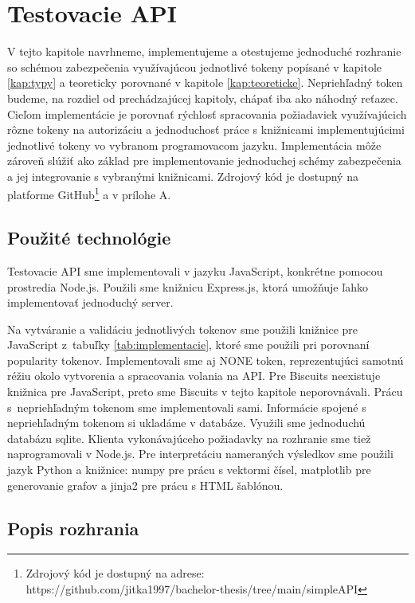 \chapter{Testovacie API}

\label{kap:prakticke} %

V tejto kapitole navrhneme, implementujeme a otestujeme jednoduché rozhranie so schémou zabezpečenia využívajúcou jednotlivé tokeny popísané v kapitole \ref{kap:typy} a teoreticky porovnané v kapitole \ref{kap:teoreticke}. Nepriehľadný token budeme, na rozdiel od prechádzajúcej kapitoly, chápať iba ako náhodný reťazec. Cieľom implementácie je porovnať rýchlosť spracovania požiadaviek využívajúcich rôzne tokeny na autorizáciu a jednoduchosť práce s knižnicami implementujúcimi jednotlivé tokeny vo vybranom programovacom jazyku. Implementácia môže zároveň slúžiť ako základ pre implementovanie jednoduchej schémy zabezpečenia a jej integrovanie s vybranými knižnicami. Zdrojový kód je dostupný na platforme GitHub\footnote{Zdrojový kód je dostupný na adrese:\\ https://github.com/jitka1997/bachelor-thesis/tree/main/simpleAPI} a v prílohe A.

\section{Použité technológie}

Testovacie API sme implementovali v jazyku JavaScript, konkrétne pomocou prostredia Node.js. Použili sme knižnicu Express.js, ktorá umožňuje ľahko implementovať jednoduchý server.

Na vytváranie a validáciu jednotlivých tokenov sme použili knižnice pre JavaScript z~tabuľky \ref{tab:implementacie}, ktoré sme použili pri porovnaní popularity tokenov. Implementovali sme aj NONE token, reprezentujúci samotnú réžiu okolo vytvorenia a spracovania volania na API. Pre Biscuits neexistuje knižnica pre JavaScript, preto sme Biscuits v tejto kapitole neporovnávali. Prácu s~nepriehľadným tokenom sme implementovali sami. Informácie spojené s nepriehľadným tokenom si ukladáme v databáze. Využili sme jednoduchú databázu sqlite. Klienta vykonávajúceho požiadavky na rozhranie sme tiež naprogramovali v Node.js. Pre interpretáciu nameraných výsledkov sme použili jazyk Python a knižnice: numpy pre prácu s vektormi čísel, matplotlib pre generovanie grafov a jinja2 pre prácu s HTML šablónou.

\section{Popis rozhrania}

